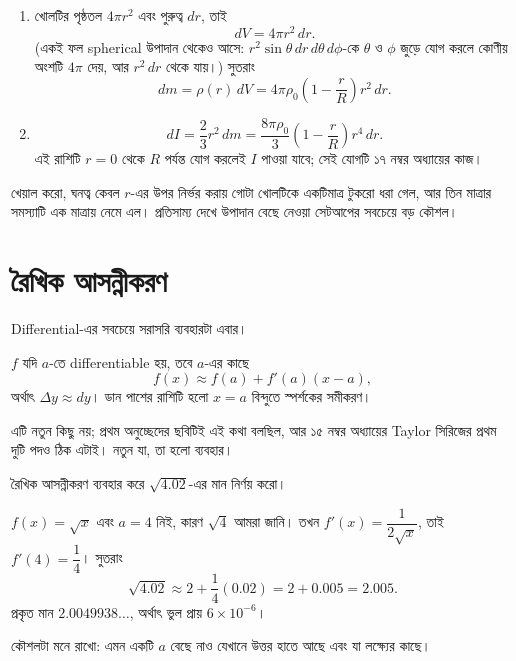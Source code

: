 \documentclass[11pt]{article}
\begin{document}
\begin{sol}
\begin{enumerate}
  \item খোলটির পৃষ্ঠতল $4\pi r^{2}$ এবং পুরুত্ব $dr$, তাই
        \[
          dV = 4\pi r^{2}\,dr .
        \]
        (একই ফল spherical উপাদান থেকেও আসে: $r^{2}\sin\theta\,dr\,d\theta\,
        d\phi$-কে $\theta$ ও $\phi$ জুড়ে যোগ করলে কোণীয় অংশটি $4\pi$ দেয়,
        আর $r^{2}\,dr$ থেকে যায়।) সুতরাং
        \[
          dm = \rho(r)\,dV
             = 4\pi\rho_{0}\left( 1 - \frac{r}{R} \right)r^{2}\,dr .
        \]
  \item \[
          dI = \frac{2}{3}r^{2}\,dm
             = \frac{8\pi\rho_{0}}{3}\left( 1 - \frac{r}{R} \right)r^{4}\,dr .
        \]
        এই রাশিটি $r = 0$ থেকে $R$ পর্যন্ত যোগ করলেই $I$ পাওয়া যাবে; সেই
        যোগটি ১৭ নম্বর অধ্যায়ের কাজ।
\end{enumerate}
খেয়াল করো, ঘনত্ব কেবল $r$-এর উপর নির্ভর করায় গোটা খোলটিকে একটিমাত্র টুকরো
ধরা গেল, আর তিন মাত্রার সমস্যাটি এক মাত্রায় নেমে এল। প্রতিসাম্য দেখে উপাদান
বেছে নেওয়া সেটআপের সবচেয়ে বড় কৌশল।
\end{sol}

\section{রৈখিক আসন্নীকরণ}

Differential-এর সবচেয়ে সরাসরি ব্যবহারটা এবার।

\begin{idea}
$f$ যদি $a$-তে differentiable হয়, তবে $a$-এর কাছে
\[
  f(x) \approx f(a) + f'(a)(x-a) ,
\]
অর্থাৎ $\Delta y \approx dy$। ডান পাশের রাশিটি হলো $x = a$ বিন্দুতে
স্পর্শকের সমীকরণ।
\end{idea}

এটি নতুন কিছু নয়; প্রথম অনুচ্ছেদের ছবিটিই এই কথা বলছিল, আর ১৫ নম্বর
অধ্যায়ের Taylor সিরিজের প্রথম দুটি পদও ঠিক এটাই। নতুন যা, তা হলো ব্যবহার।

\begin{example}
রৈখিক আসন্নীকরণ ব্যবহার করে $\sqrt{4.02}$-এর মান নির্ণয় করো।
\end{example}

\begin{solbox}
$f(x) = \sqrt{x}$ এবং $a = 4$ নিই, কারণ $\sqrt{4}$ আমরা জানি। তখন
$f'(x) = \dfrac{1}{2\sqrt{x}}$, তাই $f'(4) = \dfrac{1}{4}$। সুতরাং
\[
  \sqrt{4.02} \approx 2 + \frac{1}{4}(0.02) = 2 + 0.005 = 2.005 .
\]
প্রকৃত মান $2.0049938\ldots$, অর্থাৎ ভুল প্রায় $6 \times 10^{-6}$।

কৌশলটা মনে রাখো: এমন একটি $a$ বেছে নাও যেখানে উত্তর হাতে আছে এবং যা লক্ষ্যের
কাছে।
\end{solbox}
\end{document}
